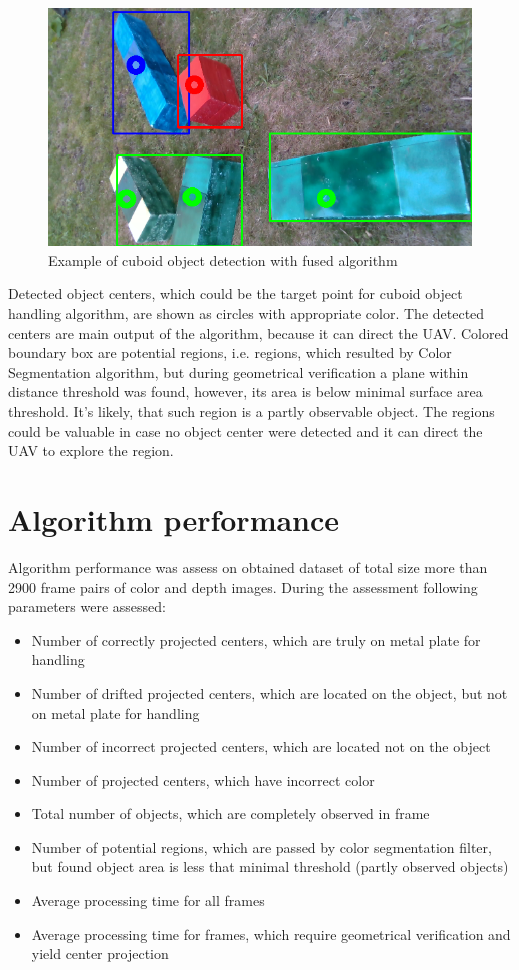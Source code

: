 \documentclass{ctuthesis}
\begin{document}
\begin{figure}[htbp]
    \centering
    \includegraphics[width=\textwidth]{fused_alg_ex.png}
    \caption{Example of cuboid object detection with fused algorithm}
    \label{fus-alg-ex}
\end{figure}

Detected object centers, which could be the target point for cuboid object handling algorithm, are shown as circles with appropriate color. The detected centers are main output of the algorithm, because it can direct the UAV. Colored boundary box are potential regions, i.e. regions, which resulted by Color Segmentation algorithm, but during geometrical verification a plane within distance threshold was found, however, its area is below minimal surface area threshold. It's likely, that such region is a partly observable object. The regions could be valuable in case no object center were detected and it can direct the UAV to explore the region.

\section{Algorithm performance}

Algorithm performance was assess on obtained dataset of total size more than 2900 frame pairs of color and depth images. During the assessment following parameters were assessed:
\begin{itemize}
  \item Number of correctly projected centers, which are truly on metal plate for handling
  \item Number of drifted projected centers, which are located on the object, but not on metal plate for handling
  \item Number of incorrect projected centers, which are located not on the object
  \item Number of projected centers, which have incorrect color
  \item Total number of objects, which are completely observed in frame
  \item Number of potential regions, which are passed by color segmentation filter, but found object area is less that minimal threshold (partly observed objects)
  \item Average processing time for all frames
  \item Average processing time for frames, which require geometrical verification and yield center projection
\end{itemize}
\end{document}
